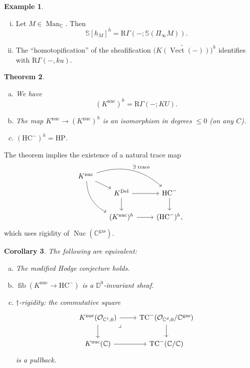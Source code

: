 \documentclass[draft]{amsart}
\newcommand{\DD}{\mathbb{D}}
\newcommand{\CC}{\mathbb{C}}
\renewcommand{\SS}{\mathbb{S}}
\newcommand{\R}{\mathrm{R}}
\renewcommand{\O}{\mathcal{O}}
\newcommand{\wt}[1]{\widetilde{#1}}
\newcommand{\blank}{-} %
\DeclareMathOperator{\fib}{fib}
\DeclareMathOperator{\Man}{Man}
\DeclareMathOperator{\Nuc}{Nuc}
\DeclareMathOperator{\Vect}{Vect}
\newtheorem{thm}{Theorem}[section]
\newtheorem{cor}[thm]{Corollary}
\theoremstyle{definition}
\newtheorem{ex}[thm]{Example}
\begin{document}
\begin{ex}
\begin{enumerate}[(i)]
\item Let $M\in \Man_{\CC}$. Then
\[
\SS[h_M]^h = \R\Gamma(\blank; \SS(\Pi_\infty M)).
\]

\item The \enquote{homotopification} of the sheafification $\bigl(\wt{K(\Vect(\blank))}\bigr)^h$ identifies with $\R\Gamma(\blank, ku)$.
\end{enumerate}
\end{ex}

\begin{thm}\label{Clausen:thm}
\begin{enumerate}[(a)]
\item We have
\[
(K^{\mathrm{nuc}})^h = \R\Gamma(\blank; KU).
\]

\item The map $K^{\mathrm{nuc}} \to (K^{\mathrm{nuc}})^h$ is an isomorphism in degrees $\le 0$ (on any $C$).

\item $(\mathrm{HC}^-)^h = \mathrm{HP}$.
\end{enumerate}
\end{thm}

The theorem implies the existence of a natural trace map
\[
\begin{tikzcd}
K^{\mathrm{nuc}} \ar[dr] \ar[drr, bend left,"{\text{$\exists$ trace}}"] \ar[ddr, bend right] &[-1em] \\[-1em]
& K^{\mathrm{Del}} \ar[r] \ar[d] & \mathrm{HC}^- \ar[d] \\
& (K^{\mathrm{nuc}})^h \ar[r] & (\mathrm{HC}^-)^h,
\end{tikzcd}
\]
which uses rigidity of $\Nuc(\CC^{\mathrm{gas}})$.

\begin{cor}
The following are equivalent:
\begin{enumerate}[(a)]
\item The modified Hodge conjecture holds.
\item $\fib(K^{\mathrm{nuc}} \to \mathrm{HC}^-)$ is a $\DD^0$-invariant sheaf.

\item $\dagger$-rigidity: the commutative square
\[
\begin{tikzcd}
K^{\mathrm{nuc}}(\O_{\CC^\dagger,0}) \ar[d] \ar[r] \ar[dr,phantom, very near start, "\lrcorner"] & \mathrm{TC}^-(\O_{\CC^d, 0}/\CC^{\mathrm{gas}}) \ar[d] \\
K^{\mathrm{nuc}}(\CC) \ar[r] & \mathrm{TC}^-(\CC/\CC)
\end{tikzcd}
\]
is a pullback.
\end{enumerate}
\end{cor}
\end{document}
